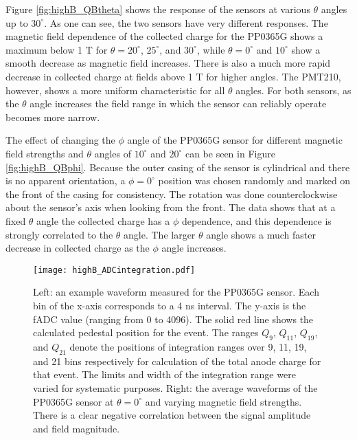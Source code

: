 Figure \ref{fig:highB_QBtheta} shows the response of the sensors at various $\theta$ angles up to $30^{\circ}$. As one can see, the two sensors have very different responses. The magnetic field dependence of the collected charge for the PP0365G shows a maximum below 1 T for $\theta = 20^{\circ}$, $25^{\circ}$, and $30^{\circ}$, while $\theta = 0^{\circ}$ and $10^{\circ}$ show a smooth decrease as magnetic field increases. There is also a much more rapid decrease in collected charge at fields above 1 T for higher angles. The PMT210, however, shows a more uniform characteristic for all $\theta$ angles. For both sensors, as the $\theta$ angle increases the field range in which the sensor can reliably operate becomes more narrow.

The effect of changing the $\phi$ angle of the PP0365G sensor for different magnetic field strengths and $\theta$ angles of $10^{\circ}$ and $20^{\circ}$ can be seen in Figure \ref{fig:highB_QBphi}. Because the outer casing of the sensor is cylindrical and there is no apparent orientation, a $\phi = 0^{\circ}$ position was chosen randomly and marked on the front of the casing for consistency. The rotation was done counterclockwise about the sensor's axis when looking from the front. The data shows that at a fixed $\theta$ angle the collected charge has a $\phi$ dependence, and this dependence is strongly correlated to the $\theta$ angle. The larger $\theta$ angle shows a much faster decrease in collected charge as the $\phi$ angle increases.

\begin{figure}[!htb]
	\centering
	\texttt{[image: highB\_ADCintegration.pdf]}
	\caption{Left: an example waveform measured for the PP0365G sensor. Each bin of the x-axis corresponds to a 4 ns interval. The y-axis is the fADC value (ranging from 0 to 4096). The solid red line shows the calculated pedestal position for the event. The ranges $Q_9$, $Q_{11}$, $Q_{19}$, and $Q_{21}$ denote the positions of integration ranges over 9, 11, 19, and 21 bins respectively for calculation of the total anode charge for that event. The limits and width of the integration range were varied for systematic purposes. Right: the average waveforms of the PP0365G sensor at $\theta = 0^{\circ}$ and varying magnetic field strengths. There is a clear negative correlation between the signal amplitude and field magnitude.}
	\label{fig:highB_waveform}
\end{figure}

